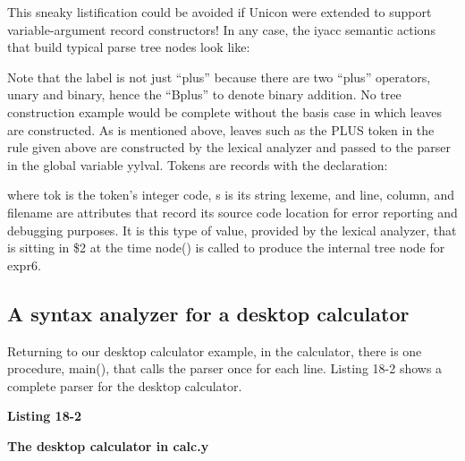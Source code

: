 
This sneaky listification could be avoided if Unicon were extended to
support variable-argument record constructors! In any case, the iyacc
semantic actions that build typical parse tree nodes look like:


Note that the label is not just
{\textquotedblleft}plus{\textquotedblright} because there are two
{\textquotedblleft}plus{\textquotedblright} operators, unary and
binary, hence the {\textquotedblleft}Bplus{\textquotedblright} to
denote binary addition. No tree construction example would be complete
without the basis case in which leaves are constructed. As is mentioned
above, leaves such as the \textsf{PLUS} token in the rule given above
are constructed by the lexical analyzer and passed to the parser in the
global variable \textsf{yylval}. Tokens are records with the
declaration:


\noindent
where \textsf{tok} is the token's integer code,
\textsf{s} is its string lexeme, and \textsf{line}, \textsf{column},
and \textsf{filename} are attributes that record its source code
location for error reporting and debugging purposes. It is this type of
value, provided by the lexical analyzer, that is sitting in
\textsf{\$2} at the time \textsf{node()} is called to produce the
internal tree node for \textsf{expr6}.

\subsection{A syntax analyzer for a desktop calculator}

Returning to our desktop calculator example, in the calculator, there is
one procedure, \textsf{main()}, that calls the parser once for each
line. Listing 18-2 shows a complete parser for the desktop calculator.

\bigskip

{\sffamily\bfseries
Listing 18-2}

{\sffamily\bfseries
The desktop calculator in calc.y}

